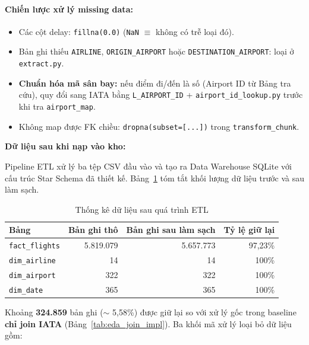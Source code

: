 \paragraph{Chiến lược xử lý missing data:}
\begin{itemize}
  \item Các cột delay: \texttt{fillna(0.0)} (\texttt{NaN} $\equiv$ không có trễ loại đó).
  \item Bản ghi thiếu \texttt{AIRLINE}, \texttt{ORIGIN\_AIRPORT} hoặc \texttt{DESTINATION\_AIRPORT}: loại ở \texttt{extract.py}.
  \item \textbf{Chuẩn hóa mã sân bay:} nếu điểm đi/đến là số (Airport ID từ Bảng tra cứu), quy đổi sang IATA
        bằng \texttt{L\_AIRPORT\_ID} + \texttt{airport\_id\_lookup.py} trước khi tra \texttt{airport\_map}.
  \item Không map được FK chiều: \texttt{dropna(subset=[...])} trong \texttt{transform\_chunk}.
\end{itemize}

\noindent \textbf{Dữ liệu sau khi nạp vào kho:}

Pipeline ETL xử lý ba tệp CSV đầu vào và tạo ra Data Warehouse SQLite
với cấu trúc Star Schema đã thiết kế. Bảng~\ref{tab:etl_stats} tóm tắt
khối lượng dữ liệu trước và sau làm sạch.

\begin{table}[H]
\centering
\caption{Thống kê dữ liệu sau quá trình ETL}
\vspace{4pt}
\begin{tabular}{|l|r|r|r|}
\hline
\textbf{Bảng} & \textbf{Bản ghi thô} & \textbf{Bản ghi sau làm sạch} & \textbf{Tỷ lệ giữ lại} \\ \hline
\texttt{fact\_flights} & 5.819.079 & 5.657.773 & 97{,}23\% \\ \hline
\texttt{dim\_airline}  & 14        & 14             & 100\%  \\ \hline
\texttt{dim\_airport}  & 322       & 322            & 100\%  \\ \hline
\texttt{dim\_date}     & 365       & 365            & 100\%  \\ \hline
\end{tabular}
\label{tab:etl_stats}
\end{table}

Khoảng \textbf{324.859} bản ghi ($\sim$ 5{,}58\%) được giữ lại so với xử lý gốc trong baseline \textbf{chỉ join IATA} (Bảng~\ref{tab:eda_join_impl}). Ba khối mã xử lý loại bỏ dữ liệu gồm:

